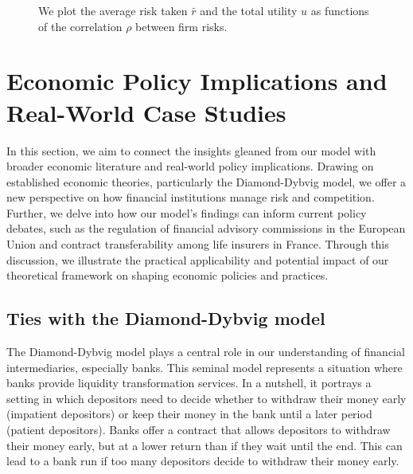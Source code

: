 \documentclass[preprint,12pt,authoryear]{elsarticle}
\theoremstyle{definition}
\begin{document}
\begin{figure}[htbp]
  \centering
  \begin{minipage}[t]{0.48\textwidth}
    \centering
    
  \end{minipage}
  \hfill
  \begin{minipage}[t]{0.48\textwidth}
    \centering
    
  \end{minipage}
  \begin{minipage}[t]{0.48\textwidth}
    \centering
    
  \end{minipage}
  \hfill
  \begin{minipage}[t]{0.48\textwidth}
    \centering
    
  \end{minipage}
  \caption{We plot the average risk taken $\bar r$ and the total utility $u$ as functions of the correlation $\rho$ between firm risks.}
  \label{fig:result-corr}  
\end{figure}


\section{Economic Policy Implications and Real-World Case Studies}

In this section, we aim to connect the insights gleaned from our model with broader economic literature and real-world policy implications. Drawing on established economic theories, particularly the Diamond-Dybvig model, we offer a new perspective on how financial institutions manage risk and competition. Further, we delve into how our model's findings can inform current policy debates, such as the regulation of financial advisory commissions in the European Union and contract transferability among life insurers in France. Through this discussion, we illustrate the practical applicability and potential impact of our theoretical framework on shaping economic policies and practices.

\subsection{Ties with the Diamond-Dybvig model}

The Diamond-Dybvig model \citep{diamond1983bank} plays a central role in our understanding of financial intermediaries, especially banks. This seminal model represents a situation where banks provide liquidity transformation services. In a nutshell, it portrays a setting in which depositors need to decide whether to withdraw their money early (impatient depositors) or keep their money in the bank until a later period (patient depositors). Banks offer a contract that allows depositors to withdraw their money early, but at a lower return than if they wait until the end. This can lead to a bank run if too many depositors decide to withdraw their money early.
\end{document}
